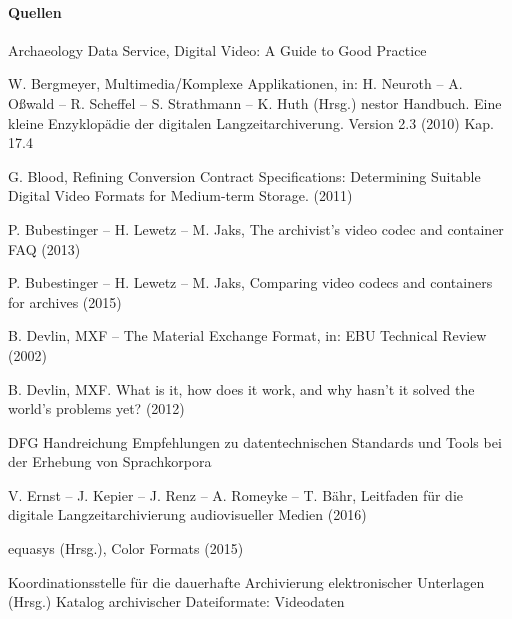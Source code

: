 \paragraph{Quellen}
\begin{flushleft}
Archaeology Data Service, Digital Video: A Guide to Good Practice 

W. Bergmeyer, Multimedia/Komplexe Applikationen, in: H. Neuroth -- A. Oßwald -- R. Scheffel -- S. Strathmann -- K. Huth (Hrsg.) nestor Handbuch. Eine kleine Enzyklopädie der digitalen Langzeitarchiverung. Version 2.3 (2010) Kap. 17.4 

G. Blood, Refining Conversion Contract Specifications: Determining Suitable Digital Video Formats for Medium-term Storage. (2011) 

P. Bubestinger -- H. Lewetz -- M. Jaks, The archivist's video codec and container FAQ (2013) 

P. Bubestinger -- H. Lewetz -- M. Jaks, Comparing video codecs and containers for archives (2015) 

B. Devlin, MXF -- The Material Exchange Format, in: EBU Technical Review (2002) 

B. Devlin, MXF. What is it, how does it work, and why hasn't it solved the world's problems yet? (2012) 

DFG Handreichung Empfehlungen zu datentechnischen Standards und Tools bei der Erhebung von Sprachkorpora

V. Ernst -- J. Kepier -- J. Renz -- A. Romeyke -- T. Bähr, Leitfaden für die digitale Langzeitarchivierung audiovisueller Medien (2016) 

equasys (Hrsg.), Color Formats (2015) 

Koordinationsstelle für die dauerhafte Archivierung elektronischer Unterlagen (Hrsg.) Katalog archivischer Dateiformate: Videodaten 


\end{flushleft}
